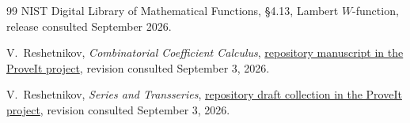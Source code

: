 \documentclass[11pt,a4paper]{article}
\theoremstyle{definition}
\theoremstyle{remark}
\begin{document}
\begin{thebibliography}{99}
NIST Digital Library of Mathematical Functions,
\newblock \S4.13, Lambert \(W\)-function,
\newblock release consulted September 2026.

V.~Reshetnikov,
\newblock \emph{Combinatorial Coefficient Calculus},
\newblock \href{https://github.com/VladimirReshetnikov/ProveIt/tree/main/Analysis/FabiusFunction/docs/semi-formalized-research-frontiers/drafts/combinatorial-coefficient-calculus/Combinatorial_Coefficient_Calculus}{repository manuscript in the ProveIt project},
revision consulted September 3, 2026.

V.~Reshetnikov,
\newblock \emph{Series and Transseries},
\newblock \href{https://github.com/VladimirReshetnikov/ProveIt/tree/main/Analysis/FabiusFunction/docs/semi-formalized-research-frontiers/drafts/series-and-transseries}{repository draft collection in the ProveIt project},
revision consulted September 3, 2026.

\end{thebibliography}
\end{document}
